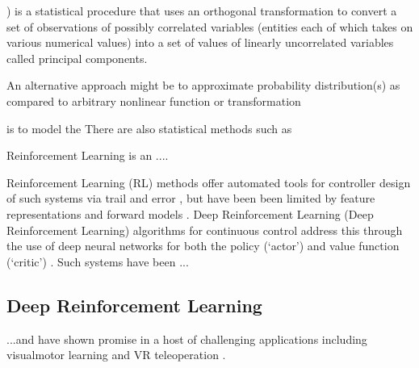 \documentclass[letterpaper, 10 pt, conference]{ieeeconf}
\begin{document}
) is a statistical procedure that uses an orthogonal transformation to convert a set of observations of possibly correlated variables (entities each of which takes on various numerical values) into a set of values of linearly uncorrelated variables called principal components.


An alternative approach might be to approximate  probability distribution(s) as compared to arbitrary nonlinear function or transformation

is to model the There are also statistical methods such as 







Reinforcement Learning is an ....  

Reinforcement Learning (RL) methods offer automated tools for controller design of such systems via trail and error \cite{sutton1998reinforcement}, but have been been limited by feature representations and forward models \cite{duan2016benchmarking}.
Deep Reinforcement Learning (Deep Reinforcement Learning) algorithms for continuous control address this through the use of deep neural networks for both the policy (`actor') and value function (`critic') \cite{DDPG, SAC}.
Such systems have been  ...

\subsection{Deep Reinforcement Learning}

...and have shown promise in a host of challenging applications including visualmotor learning \cite{finn2016deep} and VR teleoperation \cite{zhang2018deep}. 




\end{document}
